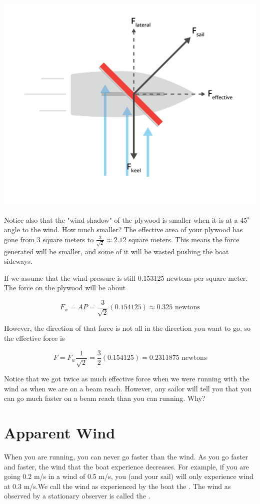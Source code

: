 \includegraphics[width=.75\textwidth]{pressure2.png}


Notice also that the "wind shadow" of the plywood is smaller when it is at a $45^\circ$ angle to the wind.  How much smaller?  The effective area of your plywood has 
gone from 3 square meters to $\frac{3}{\sqrt{2}} \approx 2.12$ square meters. This means the force generated will be smaller, and some of it will be wasted pushing the boat sideways.

If we assume that the wind pressure is still 0.153125 newtons per square meter. The force on the plywood will be about

$$F_w = A P = \frac{3}{\sqrt{2}}(0.154125) \approx 0.325 \text{ newtons}$$

However, the direction of that force is not all in the direction you want to go, so the effective force is

$$F = F_w \frac{1}{\sqrt{2}} =  \frac{3}{2}(0.154125) = 0.2311875 \text{ newtons}$$

Notice that we got twice as much effective force when we were running with the wind as when we are on a beam reach.  However, any sailor will tell you that you can go much faster
on a beam reach than you can running. Why?

\section{Apparent Wind}

When you are running,  you can never go faster than the wind.   As you go faster and faster,  the wind that the boat experience decreases. For example, if you are going 0.2 m/s in a wind 
of 0.5 m/s,  you (and your sail) will only experience wind at 0.3 m/s.We call the wind as experienced by the boat 
the .  The wind as observed by a stationary observer is called the .


